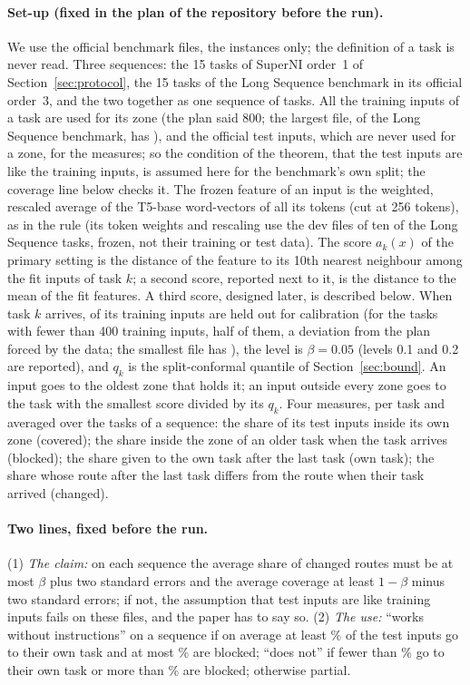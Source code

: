 \paragraph{Set-up (fixed in the plan of the repository before the run).} We use the official benchmark files, the instances only; the definition of a task is never read. Three sequences: the 15 tasks of SuperNI order~1 of Section~\ref{sec:protocol}, the 15 tasks of the Long Sequence benchmark in its
official order~3, and the two together as one sequence of \BoundTasksBoth{} tasks. All the training inputs of a task are used for its zone (the plan said 800; the largest file, of the Long Sequence benchmark, has \BoundTrainMax{}), and the official test inputs, which are never used for a zone, for the measures; so the condition of the theorem, that the test inputs are like the training inputs, is assumed here for the benchmark's own split; the coverage line below checks it.
The frozen feature of an input is the weighted, rescaled average of the T5-base word-vectors of all its tokens (cut at 256 tokens), as in the rule \centre{} (its token weights and rescaling use the dev files of ten of the Long Sequence tasks, frozen, not their training or test data). The score $a_k(x)$ of the primary setting is the distance of the feature to its 10th nearest neighbour among the fit inputs of task $k$; a second score, reported next to it, is the distance to the mean of the fit features. A third score, designed later, is described below. When task $k$ arrives,
\BoundMCal{} of its training inputs are held out for calibration (for the \BoundSmallTasks{} tasks with fewer than 400 training inputs, half of them, a deviation from the plan forced by the data; the smallest file has \BoundSmallMin{}), the level is $\beta = 0.05$ (levels 0.1 and 0.2 are reported), and $q_k$ is the split-conformal quantile of Section~\ref{sec:bound}. An input goes to the oldest zone that holds it; an input outside every zone goes to the task with the smallest score divided by its $q_k$.
Four measures, per task and averaged over the tasks of a sequence: the share of its test inputs inside its own zone (covered); the share inside the zone of an older task when the task arrives (blocked); the share given to the own task after the last task (own task); the share whose route after the last task differs from the route when their task arrived (changed).

\paragraph{Two lines, fixed before the run.} (1) \emph{The claim:} on each sequence the average share of changed routes must be at most $\beta$ plus two standard errors and the average coverage at least $1 - \beta$ minus two standard errors; if not, the assumption that test inputs are like training inputs fails on these files, and the paper has to say so. (2) \emph{The use:} ``works without instructions'' on a sequence if on average at least \BoundLineOwn{}\% of the test inputs go to their own task and at most \BoundLineBlock{}\% are blocked; ``does not'' if fewer than \BoundLineNotOwn{}\% go to their own task or more than \BoundLineNotBlock{}\% are blocked; otherwise partial.

